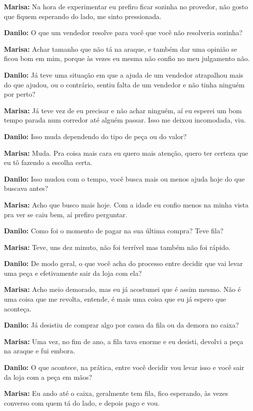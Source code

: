 \textbf{Marisa:} Na hora de experimentar eu prefiro ficar sozinha no provedor, não gosto que fiquem esperando do lado, me sinto pressionada.

\textbf{Danilo:} O que um vendedor resolve para você que você não resolveria sozinha?

\textbf{Marisa:} Achar tamanho que não tá na araque, e também dar uma opinião se ficou bom em mim, porque às vezes eu mesma não confio no meu julgamento não.

\textbf{Danilo:} Já teve uma situação em que a ajuda de um vendedor atrapalhou mais do que ajudou, ou o contrário, sentiu falta de um vendedor e não tinha ninguém por perto?

\textbf{Marisa:} Já teve vez de eu precisar e não achar ninguém, aí eu esperei um bom tempo parada num corredor até alguém passar. Isso me deixou incomodada, viu.

\textbf{Danilo:} Isso muda dependendo do tipo de peça ou do valor?

\textbf{Marisa:} Muda. Pra coisa mais cara eu quero mais atenção, quero ter certeza que eu tô fazendo a escolha certa.

\textbf{Danilo:} Isso mudou com o tempo, você busca mais ou menos ajuda hoje do que buscava antes?

\textbf{Marisa:} Acho que busco mais hoje. Com a idade eu confio menos na minha vista pra ver se caiu bem, aí prefiro perguntar.

\textbf{Danilo:} Como foi o momento de pagar na sua última compra? Teve fila?

\textbf{Marisa:} Teve, uns dez minuto, não foi terrível mas também não foi rápido.

\textbf{Danilo:} De modo geral, o que você acha do processo entre decidir que vai levar uma peça e efetivamente sair da loja com ela?

\textbf{Marisa:} Acho meio demorado, mas eu já acostumei que é assim mesmo. Não é uma coisa que me revolta, entende, é mais uma coisa que eu já espero que aconteça.

\textbf{Danilo:} Já desistiu de comprar algo por causa da fila ou da demora no caixa?

\textbf{Marisa:} Uma vez, no fim de ano, a fila tava enorme e eu desisti, devolvi a peça na araque e fui embora.

\textbf{Danilo:} O que acontece, na prática, entre você decidir vou levar isso e você sair da loja com a peça em mãos?

\textbf{Marisa:} Eu ando até o caixa, geralmente tem fila, fico esperando, às vezes converso com quem tá do lado, e depois pago e vou.

